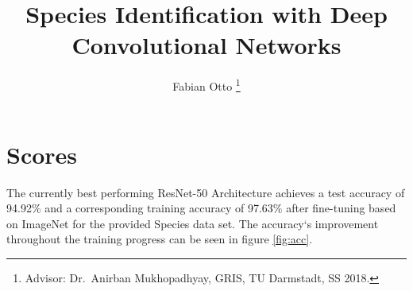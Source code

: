 \documentclass[journal, a4paper]{IEEEtran}
\begin{document}
	\title{Species Identification with Deep Convolutional Networks}
	\author{Fabian Otto
	\thanks{Advisor: Dr.~Anirban Mukhopadhyay, GRIS, TU Darmstadt, SS 2018.}}
	\maketitle


\section{Scores}

	The currently best performing ResNet-50 Architecture achieves a test accuracy of 94.92\% and a corresponding training accuracy of 97.63\% after fine-tuning based on ImageNet for the provided Species data set.
	The accuracy`s improvement throughout the training progress can be seen in figure \ref{fig:acc}.
	
\end{document}
